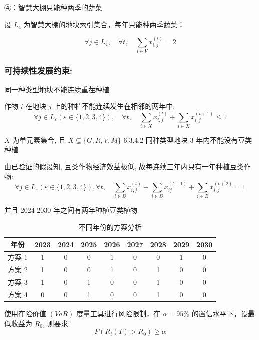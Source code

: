 \documentclass[12pt]{ctexart}
\begin{document}
	④：智慧大棚只能种两季的蔬菜
	
	设 $L_4$ 为智慧大棚的地块索引集合，每年只能种两季蔬菜：
	
		\begin{equation}
	\forall j \in L_4, \quad \forall t, \quad \sum_{i \in V} x_{i, j}^{(t)}=2
\end{equation}
	
	\subsubsection{可持续性发展约束:}
	同一种类型地块不能连续重茬种植
	
	作物 $i$ 在地块 $j$ 上的种植不能连续发生在相邻的两年中:
	\begin{equation}
	\forall j \in L_{\varepsilon}(\varepsilon \in\{1,2,3,4\}), \quad \forall t, \quad \sum_{i \in X} x_{i, j}^{(t)}+\sum_{i \in X} x_{i, j}^{(t+1)} \leq 1
    \end{equation}
	
	$X$ 为单元素集合, 且 $X \subseteq\{G, R, V, M\}$
	6.3.4.2 同种类型地块 3 年内不能没有豆类种植
	
	由已验证的假设知, 豆类作物经济效益极低, 故每连续三年内只有一年种植豆类作物:
	\begin{equation}
	\forall j \in L_{\varepsilon}(\varepsilon \in\{1,2,3,4\}), \forall t, \quad \sum_{i \in B} x_{i, j}^{(t)}+\sum_{i \in B} x_{i j}^{(t+1)}+\sum_{i \in B} x_{i, j}^{(t+2)}=1
\end{equation}
	
	
	并且 2024-2030 年之间有两年种植豆类植物
	\begin{table}[htbp]
		\centering
		\begin{tabular}{|c|c|c|c|c|c|c|c|c|}
			\hline  
			年份 & 2023 & 2024 & 2025 & 2026 & 2027 & 2028 & 2029 & 2030 \\
			\hline
			方案 1 & 1 & 0 & 0 & 1 & 0 & 0 & 1 & 0 \\
			\hline
			方案 2 & 1 & 0 & 0 & 1 & 0 & 1 & 0 & 0 \\
			\hline
			方案 3 & 1 & 0 & 1 & 0 & 0 & 1 & 0 & 0 \\
			\hline
			方案 4 & 0 & 0 & 1 & 0 & 0 & 1 & 0 & 0 \\
			\hline
		\end{tabular}  
		\caption{不同年份的方案分析}
	\end{table}
	
	使用在险价值 $(V a R)$ 度量工具进行风险限制，在 $\alpha=95 \%$ 的置信水平下，设最低收益为 $R_0$, 则要求:
	\begin{equation}
	P\left(R_i(T)>R_0\right) \geq \alpha
\end{equation}
	
\end{document}
